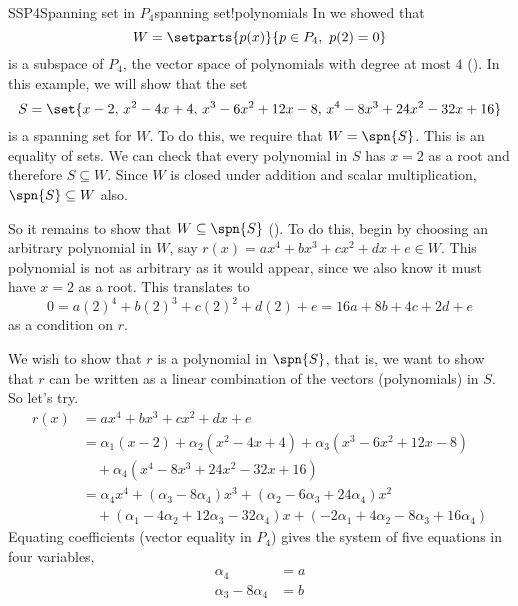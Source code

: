 \begin{example}{SSP4}{Spanning set in $P_4$}{spanning set!polynomials}
In  we showed that
%
\begin{equation*}
W=\setparts{p(x)}{p\in P_4,\ p(2)=0}
\end{equation*}
%
is a subspace of $P_4$, the vector space of polynomials with degree at most $4$ ().  In this example, we will show that the set
%
\begin{equation*}
S=\set{x-2,\,x^2-4x+4,\,x^3-6x^2+12x-8,\,x^4-8x^3+24x^2-32x+16}
\end{equation*}
%
is a spanning set for $W$.  To do this, we require that $W=\spn{S}$.  This is an equality of sets.  We can check that every polynomial in $S$ has $x=2$ as a root and therefore $S\subseteq W$.  Since $W$ is closed under addition and scalar multiplication, $\spn{S}\subseteq W$ also.\par
%
So it remains to show that $W\subseteq \spn{S}$ ().  To do this, begin by choosing an arbitrary polynomial in $W$, say $r(x)=ax^4+bx^3+cx^2+dx+e\in W$.  This polynomial is not as arbitrary as it would appear, since we also know it must have $x=2$ as a root.  This translates to
%
\begin{equation*}
0=a(2)^4+b(2)^3+c(2)^2+d(2)+e=16a+8b+4c+2d+e
\end{equation*}
%
as a condition on $r$.\par
%
We wish to show that $r$ is a polynomial in $\spn{S}$, that is, we want to show that $r$ can be written as a linear combination of the vectors (polynomials) in $S$.  So let's try.
%
\begin{align*}
r(x)&=ax^4+bx^3+cx^2+dx+e\\
&=\alpha_1\left(x-2\right)+\alpha_2\left(x^2-4x+4\right)+\alpha_3\left(x^3-6x^2+12x-8\right)\\
&\quad +\alpha_4\left(x^4-8x^3+24x^2-32x+16\right)\\
%
&=\alpha_4x^4+
\left(\alpha_3-8\alpha_4\right)x^3+
\left(\alpha_2-6\alpha_3+24\alpha_4\right)x^2\\
&\quad +
\left(\alpha_1-4\alpha_2+12\alpha_3-32\alpha_4\right)x+
\left(-2\alpha_1+4\alpha_2-8\alpha_3+16\alpha_4\right)
\end{align*}
%
Equating coefficients (vector equality in $P_4$) gives the system of five equations in four variables,
%
\begin{align*}
\alpha_4&=a\\
\alpha_3-8\alpha_4&=b\\

\end{align*}
\end{example}

